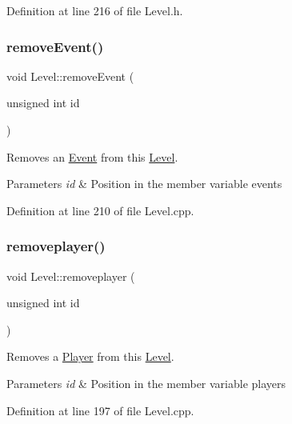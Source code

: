 Definition at line 216 of file Level.\+h.

\hypertarget{class_level_a8f38f4c5bc05c7c7c4d4ea1321d91b84}{}\label{class_level_a8f38f4c5bc05c7c7c4d4ea1321d91b84} 
\subsubsection{\texorpdfstring{remove\+Event()}{removeEvent()}}
{\footnotesize\ttfamily void Level\+::remove\+Event (\begin{DoxyParamCaption}\item[{unsigned int}]{id }\end{DoxyParamCaption})}



Removes an \hyperlink{class_event}{Event} from this \hyperlink{class_level}{Level}. 


\begin{DoxyParams}{Parameters}
{\em id} & Position in the member variable events \\
\hline
\end{DoxyParams}


Definition at line 210 of file Level.\+cpp.

\hypertarget{class_level_a68ca29bc1f8796b8ee89f6d9a77b3e2a}{}\label{class_level_a68ca29bc1f8796b8ee89f6d9a77b3e2a} 
\subsubsection{\texorpdfstring{removeplayer()}{removeplayer()}}
{\footnotesize\ttfamily void Level\+::removeplayer (\begin{DoxyParamCaption}\item[{unsigned int}]{id }\end{DoxyParamCaption})}



Removes a \hyperlink{class_player}{Player} from this \hyperlink{class_level}{Level}. 


\begin{DoxyParams}{Parameters}
{\em id} & Position in the member variable players \\
\hline
\end{DoxyParams}


Definition at line 197 of file Level.\+cpp.

\hypertarget{class_level_aa666e5fe87af336fd7350ac0b72b7c8c}{}\label{class_level_aa666e5fe87af336fd7350ac0b72b7c8c} 
